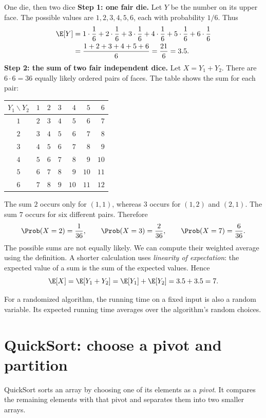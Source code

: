 \documentclass[a4paper,12pt,oneside]{report}
\begin{document}
\begin{framedexample}{One die, then two dice}\label{ex:dice-expectation}
\textbf{Step 1: one fair die.}
Let $Y$ be the number on its upper face. The possible values are
$1,2,3,4,5,6$, each with probability $1/6$. Thus
\begin{align*}
  \E[Y]&=1\cdot\frac16+2\cdot\frac16+3\cdot\frac16
    +4\cdot\frac16+5\cdot\frac16+6\cdot\frac16\\
    &=\frac{1+2+3+4+5+6}{6}=\frac{21}{6}=3.5.
\end{align*}
\textbf{Step 2: the sum of two fair independent dice.}
Let $X=Y_1+Y_2$. There are $6\cdot6=36$ equally likely ordered pairs
of faces. The table shows the sum for each pair:
\begin{center}
\begin{tabular}{c|rrrrrr}
  $Y_1\backslash Y_2$ & $1$ & $2$ & $3$ & $4$ & $5$ & $6$\\\hline
  $1$ & $2$ & $3$ & $4$ & $5$ & $6$ & $7$\\
  $2$ & $3$ & $4$ & $5$ & $6$ & $7$ & $8$\\
  $3$ & $4$ & $5$ & $6$ & $7$ & $8$ & $9$\\
  $4$ & $5$ & $6$ & $7$ & $8$ & $9$ & $10$\\
  $5$ & $6$ & $7$ & $8$ & $9$ & $10$ & $11$\\
  $6$ & $7$ & $8$ & $9$ & $10$ & $11$ & $12$
\end{tabular}
\end{center}
The sum $2$ occurs only for $(1,1)$, whereas $3$ occurs for $(1,2)$
and $(2,1)$. The sum $7$ occurs for six different pairs. Therefore
\[
  \Prob(X=2)=\frac1{36},\qquad
  \Prob(X=3)=\frac2{36},\qquad
  \Prob(X=7)=\frac6{36}.
\]
The possible sums are not equally likely. We can compute their
weighted average using the definition. A shorter calculation uses
\emph{linearity of expectation}: the expected value of a sum is the
sum of the expected values. Hence
\[
  \E[X]=\E[Y_1+Y_2]=\E[Y_1]+\E[Y_2]=3.5+3.5=7.
\]
\end{framedexample}

For a randomized algorithm, the running time on a fixed input is
also a random variable. Its expected running time averages over the
algorithm's random choices.

\section{QuickSort: choose a pivot and partition}

QuickSort sorts an array by choosing one of its elements as a
\emph{pivot}. It compares the remaining elements with that pivot and
separates them into two smaller arrays.
\end{document}
